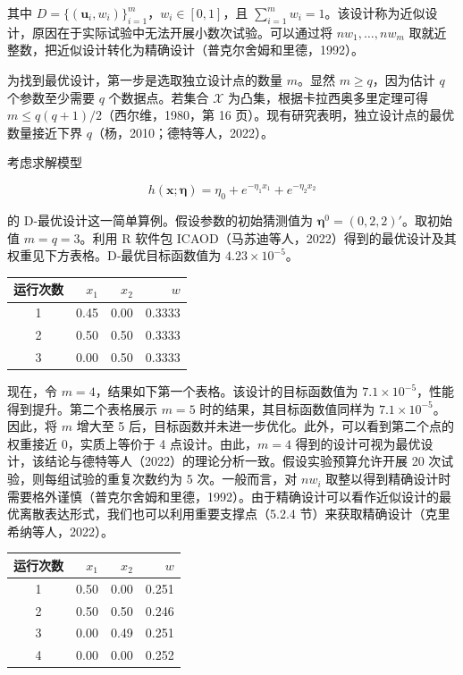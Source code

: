\documentclass{ctexart}
\begin{document}
其中 $D=\{(\boldsymbol{u}_i,w_i)\}_{i=1}^{m}$，$w_i\in[0,1]$，且 $\sum_{i=1}^{m}w_i=1$。该设计称为近似设计，原因在于实际试验中无法开展小数次试验。可以通过将 $nw_1,\dots,nw_m$ 取就近整数，把近似设计转化为精确设计（普克尔舍姆和里德，1992）。

为找到最优设计，第一步是选取独立设计点的数量 $m$。显然 $m\ge q$，因为估计 $q$ 个参数至少需要 $q$ 个数据点。若集合 $\mathcal{X}$ 为凸集，根据卡拉西奥多里定理可得 $m\le q(q+1)/2$（西尔维，1980，第 16 页）。现有研究表明，独立设计点的最优数量接近下界 $q$（杨，2010；德特等人，2022）。

考虑求解模型

\begin{equation*}
h(\boldsymbol{x};\boldsymbol{\eta})=\eta_0+e^{-\eta_1x_1}+e^{-\eta_2x_2}
\tag{9.12}
\end{equation*}

的 D‑最优设计这一简单算例。假设参数的初始猜测值为 $\boldsymbol{\eta}^0=(0,2,2)'$。取初始值 $m=q=3$。利用 R 软件包 ICAOD（马苏迪等人，2022）得到的最优设计及其权重见下方表格。D‑最优目标函数值为 $4.23\times10^{-5}$。

\begin{table}[htbp]
\begin{tabular}{c|r|r|r}
\hline
运行次数 & $x_1$ & $x_2$ & $w$ \\
\hline
1 & 0.45 & 0.00 & 0.3333 \\
2 & 0.50 & 0.50 & 0.3333 \\
3 & 0.00 & 0.50 & 0.3333 \\
\hline
\end{tabular}
\end{table}

现在，令 $m=4$，结果如下第一个表格。该设计的目标函数值为 $7.1\times10^{-5}$，性能得到提升。第二个表格展示 $m=5$ 时的结果，其目标函数值同样为 $7.1\times10^{-5}$。因此，将 $m$ 增大至 5 后，目标函数并未进一步优化。此外，可以看到第二个点的权重接近 0，实质上等价于 4 点设计。由此，$m=4$ 得到的设计可视为最优设计，该结论与德特等人（2022）的理论分析一致。假设实验预算允许开展 20 次试验，则每组试验的重复次数约为 5 次。一般而言，对 $nw_i$ 取整以得到精确设计时需要格外谨慎（普克尔舍姆和里德，1992）。由于精确设计可以看作近似设计的最优离散表达形式，我们也可以利用重要支撑点（5.2.4 节）来获取精确设计（克里希纳等人，2022）。

\begin{table}[htbp]
\begin{tabular}{c|r|r|r}
\hline
运行次数 & $x_1$ & $x_2$ & $w$ \\
\hline
1 & 0.50 & 0.00 & 0.251 \\
2 & 0.50 & 0.50 & 0.246 \\
3 & 0.00 & 0.49 & 0.251 \\
4 & 0.00 & 0.00 & 0.252 \\
\hline
\end{tabular}
\end{table}
\end{document}
